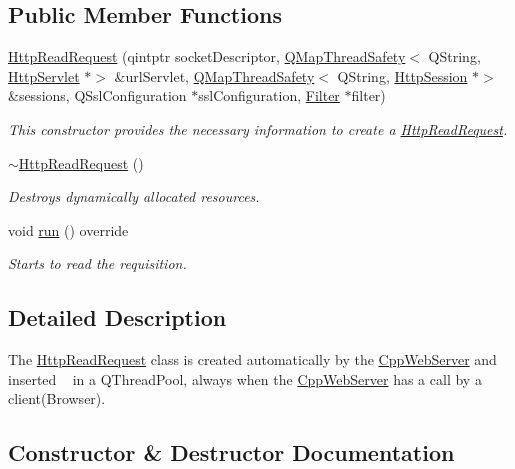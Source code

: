 \subsection*{Public Member Functions}
\begin{DoxyCompactItemize}
\item 
\hyperlink{class_http_read_request_ae585e99b43ee991c3b4884a1852eeb82}{Http\+Read\+Request} (qintptr socket\+Descriptor, \hyperlink{class_q_map_thread_safety}{Q\+Map\+Thread\+Safety}$<$ Q\+String, \hyperlink{class_http_servlet}{Http\+Servlet} $\ast$$>$ \&url\+Servlet, \hyperlink{class_q_map_thread_safety}{Q\+Map\+Thread\+Safety}$<$ Q\+String, \hyperlink{class_http_session}{Http\+Session} $\ast$$>$ \&sessions, Q\+Ssl\+Configuration $\ast$ssl\+Configuration, \hyperlink{class_filter}{Filter} $\ast$filter)
\begin{DoxyCompactList}\small\item\em This constructor provides the necessary information to create a \hyperlink{class_http_read_request}{Http\+Read\+Request}. \end{DoxyCompactList}\item 
\hyperlink{class_http_read_request_a876bcf62d5428d982c5af6f35e59b963}{$\sim$\+Http\+Read\+Request} ()
\begin{DoxyCompactList}\small\item\em Destroys dynamically allocated resources. \end{DoxyCompactList}\item 
void \hyperlink{class_http_read_request_a8db91de80ce8e83a3b89758a22eec5c3}{run} () override
\begin{DoxyCompactList}\small\item\em Starts to read the requisition. \end{DoxyCompactList}\end{DoxyCompactItemize}


\subsection{Detailed Description}
The \hyperlink{class_http_read_request}{Http\+Read\+Request} class is created automatically by the \hyperlink{class_cpp_web_server}{Cpp\+Web\+Server} and inserted ~\newline
 in a Q\+Thread\+Pool, always when the \hyperlink{class_cpp_web_server}{Cpp\+Web\+Server} has a call by a client(\+Browser). 

\subsection{Constructor \& Destructor Documentation}
\mbox{\label{class_http_read_request_ae585e99b43ee991c3b4884a1852eeb82}} 
